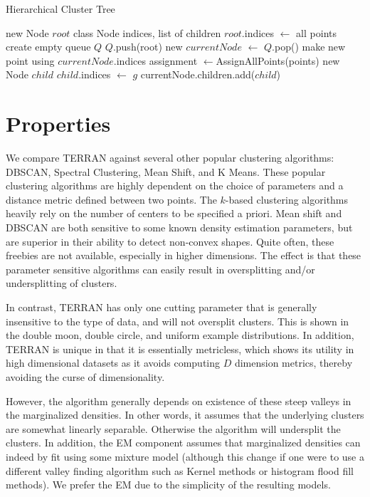 \documentclass{acm_proc_article-sp}
\begin{document}
\begin{algorithm}
\caption{Hierarchical Cluster Tree}\label{hct}
\begin{algorithmic}[1]
\State new Node $root$ \Comment class Node indices, list of children
\State $root$.indices $\leftarrow$ all points
\State create empty queue $Q$
\State $Q$.push(root)
\State new $currentNode$ $\leftarrow$ $Q$.pop()
\State make new point using $currentNode$.indices
\State assignment $\leftarrow $AssignAllPoints(points)
\State new Node $child$
\State $child$.indices $\leftarrow$ $g$
\State currentNode.children.add($child$)
\EndFor
\EndWhile
\EndProcedure
\end{algorithmic}
\end{algorithm}


\section{Properties}

We compare TERRAN against several other popular clustering algorithms: DBSCAN, Spectral Clustering, Mean Shift, and K Means. These popular clustering algorithms are highly dependent on the choice of parameters and a distance metric defined between two points. The $k$-based clustering algorithms heavily rely on the number of centers to be specified a priori. Mean shift and DBSCAN are both sensitive to some known density estimation parameters, but are superior in their ability to detect non-convex shapes. Quite often, these freebies are not available, especially in higher dimensions. The effect is that these parameter sensitive algorithms can easily result in oversplitting and/or undersplitting of clusters. 

In contrast, TERRAN has only one cutting parameter that is generally insensitive to the type of data, and will not oversplit clusters. This is shown in the double moon, double circle, and uniform example distributions. In addition, TERRAN is unique in that it is essentially metricless, which shows its utility in high dimensional datasets as it avoids computing $D$ dimension metrics, thereby avoiding the curse of dimensionality.

However, the algorithm generally depends on existence of these steep valleys in the marginalized densities. In other words, it assumes that the underlying clusters are somewhat linearly separable. Otherwise the algorithm will undersplit the clusters. In addition, the EM component assumes that marginalized densities can indeed by fit using some mixture model (although this change if one were to use a different valley finding algorithm such as Kernel methods or histogram flood fill methods). We prefer the EM due to the simplicity of the resulting models. 
\end{document}
